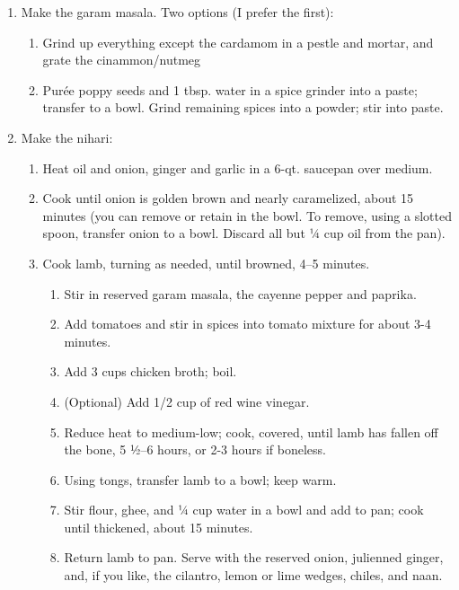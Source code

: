 \documentclass[]{article}
\providecommand{\tightlist}{%
  \setlength{\itemsep}{0pt}\setlength{\parskip}{0pt}}
\begin{document}
\begin{enumerate}
\def\labelenumi{\arabic{enumi}.}
\tightlist
\item
  Make the garam masala. Two options (I prefer the first):

  \begin{enumerate}
  \def\labelenumii{\arabic{enumii}.}
  \tightlist
  \item
    Grind up everything except the cardamom in a pestle and mortar, and grate the cinammon/nutmeg
  \item
    Purée poppy seeds and 1 tbsp. water in a spice grinder into a paste; transfer to a bowl. Grind remaining spices into a powder; stir into paste.
  \end{enumerate}
\item
  Make the nihari:

  \begin{enumerate}
  \def\labelenumii{\arabic{enumii}.}
  \tightlist
  \item
    Heat oil and onion, ginger and garlic in a 6-qt. saucepan over medium.
  \item
    Cook until onion is golden brown and nearly caramelized, about 15 minutes (you can remove or retain in the bowl. To remove, using a slotted spoon, transfer onion to a bowl. Discard all but 1⁄4 cup oil from the pan).
  \item
    Cook lamb, turning as needed, until browned, 4--5 minutes.

    \begin{enumerate}
    \def\labelenumiii{\arabic{enumiii}.}
    \tightlist
    \item
      Stir in reserved garam masala, the cayenne pepper and paprika.
    \item
      Add tomatoes and stir in spices into tomato mixture for about 3-4 minutes.
    \item
      Add 3 cups chicken broth; boil.
    \item
      (Optional) Add 1/2 cup of red wine vinegar.
    \item
      Reduce heat to medium-low; cook, covered, until lamb has fallen off the bone, 5 1⁄2--6 hours, or 2-3 hours if boneless.
    \item
      Using tongs, transfer lamb to a bowl; keep warm.
    \item
      Stir flour, ghee, and 1⁄4 cup water in a bowl and add to pan; cook until thickened, about 15 minutes.
    \item
      Return lamb to pan. Serve with the reserved onion, julienned ginger, and, if you like, the cilantro, lemon or lime wedges, chiles, and naan.
    \end{enumerate}
  \end{enumerate}
\end{enumerate}
\end{document}
